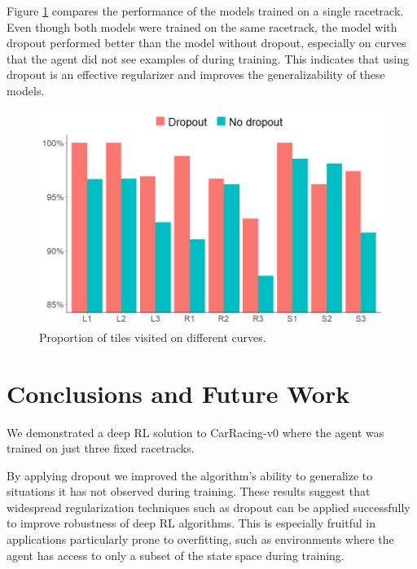 \documentclass{article}
\begin{document}
Figure \ref{fig:curves_comparison} compares the performance of the
models trained on a single racetrack. Even though both models were
trained on the same racetrack, the model with dropout performed better
than the model without dropout, especially on curves that the agent
did not see examples of during training. This indicates that using
dropout is an effective regularizer and improves the generalizability
of these models. 

\begin{figure}[!h]
\captionsetup{justification=centering}
\centering
\includegraphics[width=.65\linewidth]{Graphics/curve_plot_v2.png}
\caption{Proportion of tiles visited on different curves. }
\label{fig:curves_comparison}
\vspace{-4mm}
\end{figure}

\section{Conclusions and Future Work}
We demonstrated a deep RL solution to CarRacing-v0 where the agent was
trained on just three fixed racetracks.


By applying dropout we improved the algorithm's ability to generalize to
situations it has not observed during training. These results suggest
that widespread regularization techniques such as dropout can be
applied successfully to improve robustness of deep RL algorithms. This
is especially fruitful in applications particularly prone to
overfitting, such as environments where the agent has access to only a
subset of the state space during training.  

\end{document}
